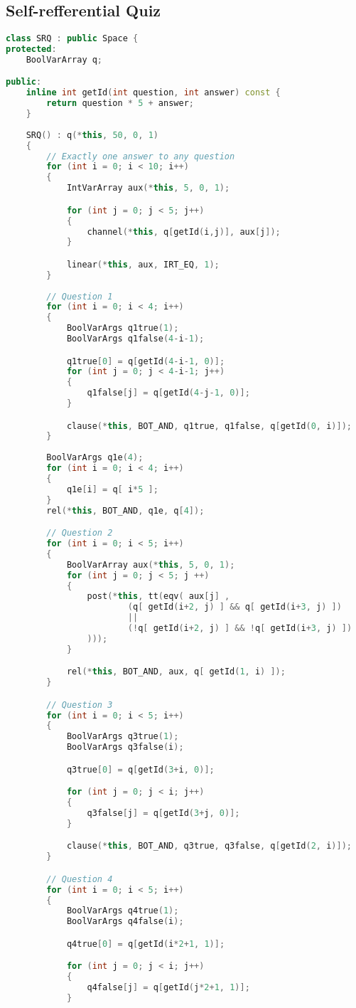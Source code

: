 \subsection{Self-refferential Quiz}
\begin{lstlisting}[language=C++]
class SRQ : public Space {
protected: 
	BoolVarArray q;

public:
	inline int getId(int question, int answer) const {
		return question * 5 + answer;
	}
	
	SRQ() : q(*this, 50, 0, 1)
	{
		// Exactly one answer to any question
		for (int i = 0; i < 10; i++)
		{
			IntVarArray aux(*this, 5, 0, 1);

			for (int j = 0; j < 5; j++)
			{
				channel(*this, q[getId(i,j)], aux[j]);
			}

			linear(*this, aux, IRT_EQ, 1);
		}
		
		// Question 1
		for (int i = 0; i < 4; i++)
		{
			BoolVarArgs q1true(1);
			BoolVarArgs q1false(4-i-1);

			q1true[0] = q[getId(4-i-1, 0)];
			for (int j = 0; j < 4-i-1; j++)
			{
				q1false[j] = q[getId(4-j-1, 0)];
			}

			clause(*this, BOT_AND, q1true, q1false, q[getId(0, i)]);
		}
		
		BoolVarArgs q1e(4);
		for (int i = 0; i < 4; i++)
		{
			q1e[i] = q[ i*5 ];
		}
		rel(*this, BOT_AND, q1e, q[4]);

		// Question 2
		for (int i = 0; i < 5; i++)
		{
			BoolVarArray aux(*this, 5, 0, 1);
			for (int j = 0; j < 5; j ++)
			{
				post(*this, tt(eqv( aux[j] , 
						(q[ getId(i+2, j) ] && q[ getId(i+3, j) ])
						||
						(!q[ getId(i+2, j) ] && !q[ getId(i+3, j) ])
				)));
			}

			rel(*this, BOT_AND, aux, q[ getId(1, i) ]);
		}

		// Question 3
		for (int i = 0; i < 5; i++)
		{
			BoolVarArgs q3true(1);
			BoolVarArgs q3false(i);

			q3true[0] = q[getId(3+i, 0)];

			for (int j = 0; j < i; j++)
			{
				q3false[j] = q[getId(3+j, 0)];
			}

			clause(*this, BOT_AND, q3true, q3false, q[getId(2, i)]);
		}

		// Question 4
		for (int i = 0; i < 5; i++)
		{
			BoolVarArgs q4true(1);
			BoolVarArgs q4false(i);

			q4true[0] = q[getId(i*2+1, 1)];

			for (int j = 0; j < i; j++)
			{
				q4false[j] = q[getId(j*2+1, 1)];
			}


\end{lstlisting}
